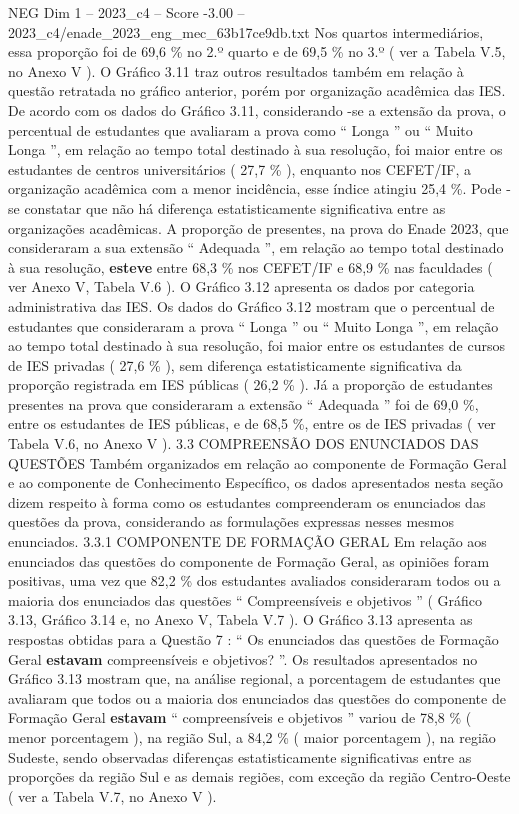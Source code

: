 \begin{textsample}{NEG Dim 1 – 2023\_c4 – Score -3.00 – 2023\_c4/enade\_2023\_eng\_mec\_63b17ce9db.txt}
Nos quartos intermediários, essa proporção foi de 69,6 \% no 2.º quarto e de 69,5 \% no 3.º ( ver a Tabela V.5, no Anexo V ).
O Gráfico 3.11 traz outros resultados também em relação à questão retratada no gráfico anterior, porém por organização acadêmica das IES.
De acordo com os dados do Gráfico 3.11, considerando -se a extensão da prova, o percentual de estudantes que avaliaram a prova como “ Longa ” ou “ Muito Longa ”, em relação ao tempo total destinado à sua resolução, foi maior entre os estudantes de centros universitários ( 27,7 \% ), enquanto nos CEFET/IF, a organização acadêmica com a menor incidência, esse índice atingiu 25,4 \%.
Pode -se constatar que não há diferença estatisticamente significativa entre as organizações acadêmicas.
A proporção de presentes, na prova do Enade 2023, que consideraram a sua extensão “ Adequada ”, em relação ao tempo total destinado à sua resolução, \textbf{esteve} entre 68,3 \% nos CEFET/IF e 68,9 \% nas faculdades ( ver Anexo V, Tabela V.6 ).
O Gráfico 3.12 apresenta os dados por categoria administrativa das IES.
Os dados do Gráfico 3.12 mostram que o percentual de estudantes que consideraram a prova “ Longa ” ou “ Muito Longa ”, em relação ao tempo total destinado à sua resolução, foi maior entre os estudantes de cursos de IES privadas ( 27,6 \% ), sem diferença estatisticamente significativa da proporção registrada em IES públicas ( 26,2 \% ).
Já a proporção de estudantes presentes na prova que consideraram a extensão “ Adequada ” foi de 69,0 \%, entre os estudantes de IES públicas, e de 68,5 \%, entre os de IES privadas ( ver Tabela V.6, no Anexo V ). 3.3 COMPREENSÃO DOS ENUNCIADOS DAS QUESTÕES Também organizados em relação ao componente de Formação Geral e ao componente de Conhecimento Específico, os dados apresentados nesta seção dizem respeito à forma como os estudantes compreenderam os enunciados das questões da prova, considerando as formulações expressas nesses mesmos enunciados. 3.3.1 COMPONENTE DE FORMAÇÃO GERAL Em relação aos enunciados das questões do componente de Formação Geral, as opiniões foram positivas, uma vez que 82,2 \% dos estudantes avaliados consideraram todos ou a maioria dos enunciados das questões “ Compreensíveis e objetivos ” ( Gráfico 3.13, Gráfico 3.14 e, no Anexo V, Tabela V.7 ).
O Gráfico 3.13 apresenta as respostas obtidas para a Questão 7 : “ Os enunciados das questões de Formação Geral \textbf{estavam} compreensíveis e objetivos? ”.
Os resultados apresentados no Gráfico 3.13 mostram que, na análise regional, a porcentagem de estudantes que avaliaram que todos ou a maioria dos enunciados das questões do componente de Formação Geral \textbf{estavam} “ compreensíveis e objetivos ” variou de 78,8 \% ( menor porcentagem ), na região Sul, a 84,2 \% ( maior porcentagem ), na região Sudeste, sendo observadas diferenças estatisticamente significativas entre as proporções da região Sul e as demais regiões, com exceção da região Centro-Oeste ( ver a Tabela V.7, no Anexo V ).

\end{textsample}
